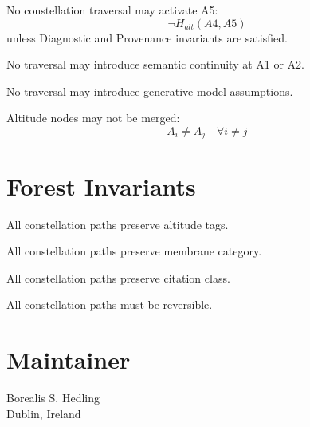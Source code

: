 \documentclass[11pt]{article}
\begin{document}
\begin{axiom}
No constellation traversal may activate A5:
\[
\neg H_{alt}(A4, A5)
\]
unless Diagnostic and Provenance invariants are satisfied.
\end{axiom}

\begin{axiom}
No traversal may introduce semantic continuity at A1 or A2.
\end{axiom}

\begin{axiom}
No traversal may introduce generative-model assumptions.
\end{axiom}

\begin{axiom}
Altitude nodes may not be merged:
\[
A_i \neq A_j \quad \forall i \neq j
\]
\end{axiom}

\section{Forest Invariants}

\begin{axiom}
All constellation paths preserve altitude tags.
\end{axiom}

\begin{axiom}
All constellation paths preserve membrane category.
\end{axiom}

\begin{axiom}
All constellation paths preserve citation class.
\end{axiom}

\begin{axiom}
All constellation paths must be reversible.
\end{axiom}

\section{Maintainer}
Borealis S. Hedling \\
Dublin, Ireland
\end{document}
